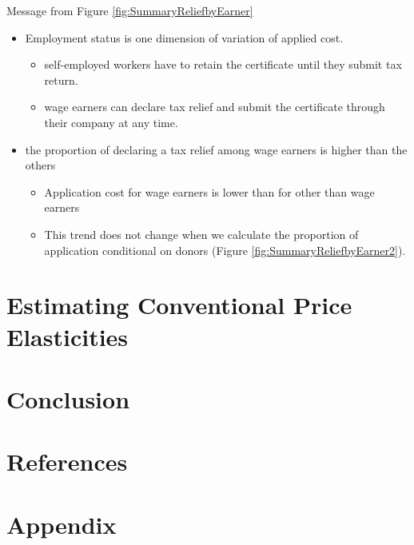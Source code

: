 \documentclass[
  ignorenonframetext,
  aspectratio=169,
]{beamer}
\providecommand{\tightlist}{%
  \setlength{\itemsep}{0pt}\setlength{\parskip}{0pt}}
\begin{document}
\begin{frame}{Message from Figure \ref{fig:SummaryReliefbyEarner}}
\protect\hypertarget{message-from-figure-reffigsummaryreliefbyearner}{}
\begin{itemize}
\tightlist
\item
  Employment status is one dimension of variation of applied cost.

  \begin{itemize}
  \tightlist
  \item
    self-employed workers have to retain the certificate until they submit tax return.
  \item
    wage earners can declare tax relief and submit the certificate through their company at any time.
  \end{itemize}
\item
  the proportion of declaring a tax relief among wage earners is higher than the others

  \begin{itemize}
  \tightlist
  \item
    Application cost for wage earners is lower than for other than wage earners
  \item
    This trend does not change when we calculate the proportion of application conditional on donors (Figure \ref{fig:SummaryReliefbyEarner2}).
  \end{itemize}
\end{itemize}
\end{frame}

\hypertarget{estimating-conventional-price-elasticities}{%
\section{Estimating Conventional Price Elasticities}\label{estimating-conventional-price-elasticities}}

\hypertarget{conclusion}{%
\section{Conclusion}\label{conclusion}}

\hypertarget{references}{%
\section*{References}\label{references}}

\hypertarget{appendix}{%
\section{Appendix}\label{appendix}}
\end{document}
